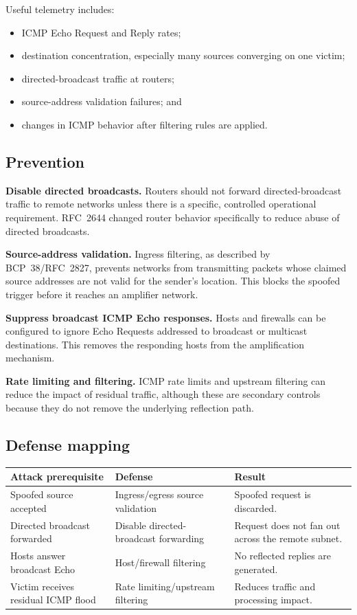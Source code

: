 \documentclass[12pt,a4paper]{article}
\begin{document}
Useful telemetry includes:
\begin{itemize}
\item ICMP Echo Request and Reply rates;
\item destination concentration, especially many sources converging on one victim;
\item directed-broadcast traffic at routers;
\item source-address validation failures; and
\item changes in ICMP behavior after filtering rules are applied.
\end{itemize}

\subsection{Prevention}
\textbf{Disable directed broadcasts.} Routers should not forward directed-broadcast traffic to remote networks unless there is a specific, controlled operational requirement. RFC~2644 changed router behavior specifically to reduce abuse of directed broadcasts.

\textbf{Source-address validation.} Ingress filtering, as described by BCP~38/RFC~2827, prevents networks from transmitting packets whose claimed source addresses are not valid for the sender's location. This blocks the spoofed trigger before it reaches an amplifier network.

\textbf{Suppress broadcast ICMP Echo responses.} Hosts and firewalls can be configured to ignore Echo Requests addressed to broadcast or multicast destinations. This removes the responding hosts from the amplification mechanism.

\textbf{Rate limiting and filtering.} ICMP rate limits and upstream filtering can reduce the impact of residual traffic, although these are secondary controls because they do not remove the underlying reflection path.

\subsection{Defense mapping}
\begin{center}
\small
\begin{tabular}{@{}p{3.5cm} p{4.2cm} p{6.8cm}@{}}
\hline
\textbf{Attack prerequisite} & \textbf{Defense} & \textbf{Result}\\
\hline
Spoofed source accepted & Ingress/egress source validation & Spoofed request is discarded.\\
Directed broadcast forwarded & Disable directed-broadcast forwarding & Request does not fan out across the remote subnet.\\
Hosts answer broadcast Echo & Host/firewall filtering & No reflected replies are generated.\\
Victim receives residual ICMP flood & Rate limiting/upstream filtering & Reduces traffic and processing impact.\\
\hline
\end{tabular}
\end{center}
\end{document}
